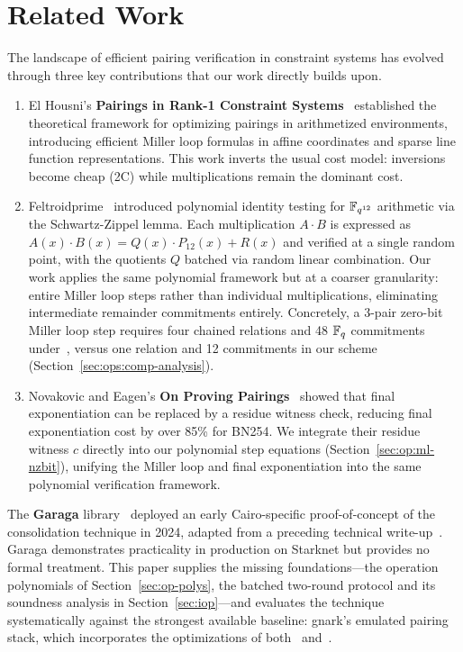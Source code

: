 \section{Related Work}

The landscape of efficient pairing verification in constraint systems has evolved through three key contributions that our work directly builds upon.

\begin{enumerate}
	\item El Housni's \textbf{Pairings in Rank-1 Constraint Systems}~\cite{PR1CS22} established the theoretical framework for optimizing pairings in arithmetized environments, introducing efficient Miller loop formulas in affine coordinates and sparse line function representations. This work inverts the usual cost model: inversions become cheap (2C) while multiplications remain the dominant cost.
	\item Feltroidprime~\cite{FXFM23} introduced polynomial identity testing for $\mathbb{F}_{q^{12}}$ arithmetic via the Schwartz-Zippel lemma. Each multiplication $A \cdot B$ is expressed as $A(x) \cdot B(x) = Q(x) \cdot P_{12}(x) + R(x)$ and verified at a single random point, with the quotients $Q$ batched via random linear combination. Our work applies the same polynomial framework but at a coarser granularity: entire Miller loop steps rather than individual multiplications, eliminating intermediate remainder commitments entirely. Concretely, a 3-pair zero-bit Miller loop step requires four chained relations and 48 $\mathbb{F}_q$ commitments under~\cite{FXFM23}, versus one relation and 12 commitments in our scheme (Section~\ref{sec:ops:comp-analysis}).
	\item Novakovic and Eagen's \textbf{On Proving Pairings}~\cite{OPP24} showed that final exponentiation can be replaced by a residue witness check, reducing final exponentiation cost by over 85\% for BN254. We integrate their residue witness $c$ directly into our polynomial step equations (Section~\ref{sec:op:ml-nzbit}), unifying the Miller loop and final exponentiation into the same polynomial verification framework.
\end{enumerate}

The \textbf{Garaga} library~\cite{grg} deployed an early Cairo-specific proof-of-concept of the consolidation technique in 2024, adapted from a preceding technical write-up~\cite{anon-cp24}. Garaga demonstrates practicality in production on Starknet but provides no formal treatment. This paper supplies the missing foundations---the operation polynomials of Section~\ref{sec:op-polys}, the batched two-round protocol and its soundness analysis in Section~\ref{sec:iop}---and evaluates the technique systematically against the strongest available baseline: gnark's emulated pairing stack, which incorporates the optimizations of both~\cite{PR1CS22} and~\cite{OPP24}.
